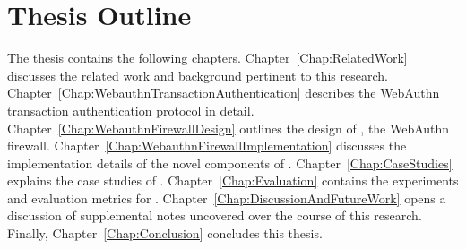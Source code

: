 
\section{Thesis Outline}

The thesis contains the following chapters. Chapter~\ref{Chap:RelatedWork} discusses the related work and background pertinent to this research. Chapter~\ref{Chap:WebauthnTransactionAuthentication} describes the WebAuthn transaction authentication protocol in detail. Chapter~\ref{Chap:WebauthnFirewallDesign} outlines the design of \sys{}, the WebAuthn firewall. Chapter~\ref{Chap:WebauthnFirewallImplementation} discusses the implementation details of the novel components of \sys{}. Chapter~\ref{Chap:CaseStudies} explains the case studies of \sys{}. Chapter~\ref{Chap:Evaluation} contains the experiments and evaluation metrics for \sys{}. Chapter~\ref{Chap:DiscussionAndFutureWork} opens a discussion of supplemental notes uncovered over the course of this research. Finally, Chapter~\ref{Chap:Conclusion} concludes this thesis.
